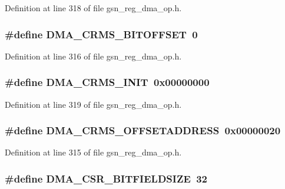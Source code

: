 Definition at line 318 of file gsn\_\-reg\_\-dma\_\-op.h.

\hypertarget{a00547_af2bcab329158e22243dd9ad3b44debd0}{
\subsubsection[{DMA\_\-CRMS\_\-BITOFFSET}]{\setlength{\rightskip}{0pt plus 5cm}\#define DMA\_\-CRMS\_\-BITOFFSET~0}}
\label{a00547_af2bcab329158e22243dd9ad3b44debd0}


Definition at line 316 of file gsn\_\-reg\_\-dma\_\-op.h.

\hypertarget{a00547_a2ed4d76d0f76f21be3cadc602c0a1125}{
\subsubsection[{DMA\_\-CRMS\_\-INIT}]{\setlength{\rightskip}{0pt plus 5cm}\#define DMA\_\-CRMS\_\-INIT~0x00000000}}
\label{a00547_a2ed4d76d0f76f21be3cadc602c0a1125}


Definition at line 319 of file gsn\_\-reg\_\-dma\_\-op.h.

\hypertarget{a00547_aada584c5cb620cb77911f073356bcd45}{
\subsubsection[{DMA\_\-CRMS\_\-OFFSETADDRESS}]{\setlength{\rightskip}{0pt plus 5cm}\#define DMA\_\-CRMS\_\-OFFSETADDRESS~0x00000020}}
\label{a00547_aada584c5cb620cb77911f073356bcd45}


Definition at line 315 of file gsn\_\-reg\_\-dma\_\-op.h.

\hypertarget{a00547_aabcdec1620a7c21914768bec9d7d15f3}{
\subsubsection[{DMA\_\-CSR\_\-BITFIELDSIZE}]{\setlength{\rightskip}{0pt plus 5cm}\#define DMA\_\-CSR\_\-BITFIELDSIZE~32}}
\label{a00547_aabcdec1620a7c21914768bec9d7d15f3}


